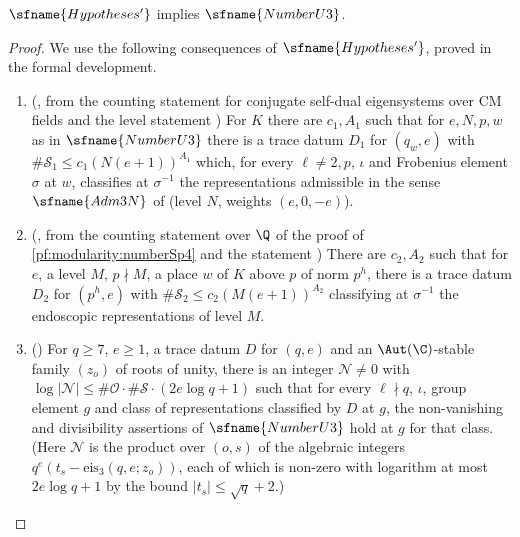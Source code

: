 \begin{proposition}\label{pf:modularity:numU3}
$\sfname{Hypotheses'}$ implies $\sfname{NumberU3}$.
\end{proposition}

\begin{proof}
We use the following consequences of $\sfname{Hypotheses'}$, proved in the formal development.
\begin{enumerate}[label=(\roman*)]
\item (, from the counting
statement for conjugate self-dual eigensystems over CM fields  and the
level statement ) For $K$ there are $c_1,A_1$ such that for $e,N,p,w$ as in
$\sfname{NumberU3}$ there is a trace datum $D_1$ for $(q_w,e)$ with $\#\mathcal S_1\le c_1(N(e+1))^{A_1}$ which, for every
$\ell\ne2,p$, $\iota$ and Frobenius element $\sigma$ at $w$, classifies at $\sigma^{-1}$ the representations admissible
in the sense $\sfname{Adm3N}$ of \cite{LeanSource2026} (level $N$, weights $(e,0,-e)$).
\item (, from the counting
statement over $\Q$ of the proof of \cref{pf:modularity:numberSp4} and the statement
) There are $c_2,A_2$ such that for $e$, a level $M$, $p\nmid M$, a place
$w$ of $K$ above $p$ of norm $p^h$, there is a trace datum $D_2$ for $(p^h,e)$ with $\#\mathcal S_2\le c_2(M(e+1))^{A_2}$
classifying at $\sigma^{-1}$ the endoscopic representations of level $M$.
\item () For $q\ge7$, $e\ge1$, a trace datum $D$
for $(q,e)$ and an $\Aut(\C)$-stable family $(z_o)$ of roots of unity, there is an integer $\mathcal N\ne0$ with
$\log|\mathcal N|\le\#\mathcal O\cdot\#\mathcal S\cdot(2e\log q+1)$ such that for every $\ell\nmid q$, $\iota$, group
element $g$ and class of representations classified by $D$ at $g$, the non-vanishing and divisibility assertions of
$\sfname{NumberU3}$ hold at $g$ for that class. (Here $\mathcal N$ is the product over $(o,s)$ of the algebraic integers
$q^e(t_s-\mathrm{eis}_3(q,e;z_o))$, each of which is non-zero with logarithm at most $2e\log q+1$ by the bound
$|t_s|\le\sqrt q+2$.)

\end{enumerate}
\end{proof}
